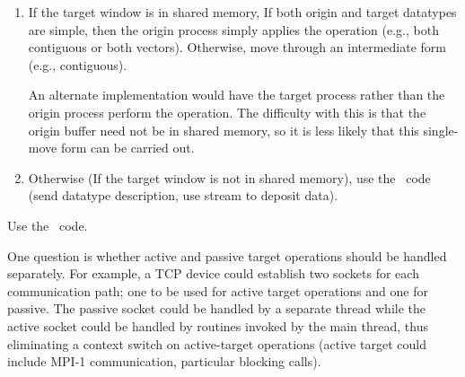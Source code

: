 \documentclass{article}
\begin{document}
\begin{shmem}
\begin{enumerate}
\item If the target window is in shared memory, 
If both origin and target datatypes are simple, then the origin process simply
applies the 
operation (e.g., both contiguous or both vectors).  Otherwise, move through an
intermediate form (e.g., contiguous).  

An alternate implementation would have the target process rather than the
origin process perform the operation.  The difficulty with this is that the
origin buffer need not be in shared memory, so it is less likely that this
single-move form can be carried out.

\item Otherwise (If the target window is not in shared memory),
use the \tcpname\ code (send datatype description, use stream to deposit
data).

\end{enumerate}
\end{shmem}
\begin{via}
Use the \tcpname\ code.  
\end{via}

One question is whether active and passive target operations should be handled
separately.  For example, a TCP device could establish two sockets for each
communication path; one to be used for active target operations and one for
passive.  The passive socket could be handled by a separate thread while the
active socket could be handled by routines invoked by the main thread, thus
eliminating a context switch on active-target operations (active target could
include MPI-1 communication, particular blocking calls).
\end{document}
